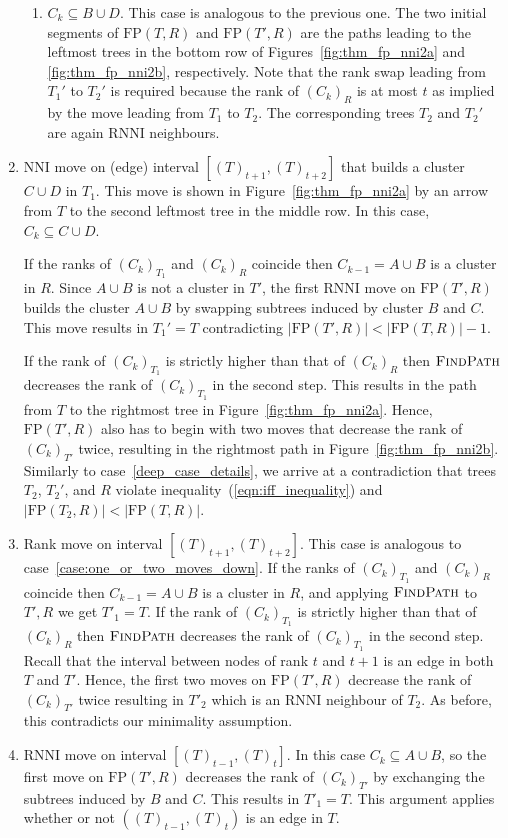 \documentclass[11pt]{amsart}
\newcommand{\rnni}{\mathrm{RNNI}}
\newcommand{\findpath}{\textsc{FindPath}}
\newcommand{\nni}{\mathrm{NNI}}
\newcommand{\fp}{\mathrm{FP}}
\begin{document}
\begin{enumerate}[label = 1.{\arabic*}]
\begin{enumerate}[label = \theenumi.\arabic*]
\item $C_k \subseteq B \cup D$.
This case is analogous to the previous one.
The two initial segments of $\fp(T, R)$ and $\fp(T', R)$ are the paths leading to the leftmost trees in the bottom row of Figures~\ref{fig:thm_fp_nni2a} and \ref{fig:thm_fp_nni2b}, respectively.
Note that the rank swap leading from $T_1'$ to $T_2'$ is required because the rank of $(C_k)_R$ is at most $t$ as implied by the move leading from $T_1$ to $T_2$.
The corresponding trees $T_2$ and $T_2'$ are again $\rnni$ neighbours.
\end{enumerate}

\item $\nni$ move on (edge) interval $[(T)_{t+1}, (T)_{t+2}]$ that builds a cluster $C \cup D$ in $T_1$.
\label{case:one_or_two_moves_down}
This move is shown in Figure~\ref{fig:thm_fp_nni2a} by an arrow from $T$ to the second leftmost tree in the middle row.
In this case, $C_k \subseteq C \cup D$.

If the ranks of $(C_k)_{T_1}$ and $(C_k)_R$ coincide then $C_{k-1} = A \cup B$ is a cluster in $R$.
Since $A \cup B$ is not a cluster in $T'$, the first $\rnni$ move on $\fp(T', R)$ builds the cluster $A \cup B$ by swapping subtrees induced by cluster $B$ and $C$.
This move results in $T_1' = T$ contradicting $|\fp(T',R)| < |\fp(T,R)| - 1$.

If the rank of $(C_k)_{T_1}$ is strictly higher than that of $(C_k)_R$ then $\findpath$ decreases the rank of $(C_k)_{T_1}$ in the second step.
This results in the path from $T$ to the rightmost tree in Figure~\ref{fig:thm_fp_nni2a}.
Hence, $\fp(T', R)$ also has to begin with two moves that decrease the rank of $(C_k)_{T'}$ twice, resulting in the rightmost path in Figure~\ref{fig:thm_fp_nni2b}.
Similarly to case~\ref{deep_case_details}, we arrive at a contradiction that trees $T_2$, $T_2'$, and $R$ violate inequality~(\ref{eqn:iff_inequality}) and $|\fp(T_2,R)| < |\fp(T,R)|$.

\item Rank move on interval $[(T)_{t+1},(T)_{t+2}]$.
\label{case:rank_move_interval_above}
This case is analogous to case~\ref{case:one_or_two_moves_down}.
If the ranks of $(C_k)_{T_1}$ and $(C_k)_R$ coincide then $C_{k-1} = A \cup B$ is a cluster in $R$, and applying $\findpath$ to $T', R$ we get $T'_1 = T$.
If the rank of $(C_k)_{T_1}$ is strictly higher than that of $(C_k)_R$ then $\findpath$ decreases the rank of $(C_k)_{T_1}$ in the second step.
Recall that the interval between nodes of rank $t$ and $t+1$ is an edge in both $T$ and $T'$.
Hence, the first two moves on $\fp(T', R)$ decrease the rank of $(C_k)_{T'}$ twice resulting in $T'_2$ which is an $\rnni$ neighbour of $T_2$.
As before, this contradicts our minimality assumption.

\item $\rnni$ move on interval $[(T)_{t-1},(T)_t]$.
In this case $C_k \subseteq A \cup B$, so the first move on $\fp(T', R)$ decreases the rank of $(C_k)_{T'}$ by exchanging the subtrees induced by $B$ and $C$.
This results in $T'_1 = T$.
This argument applies whether or not $((T)_{t-1},(T)_t)$ is an edge in $T$.
\end{enumerate}
\end{document}
